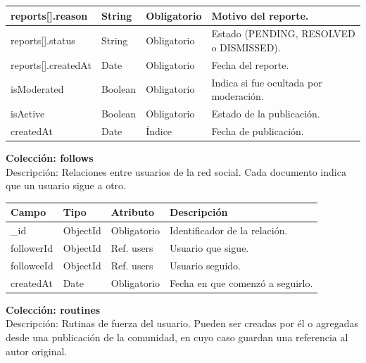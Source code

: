 {\begin{longtable}{|>{\raggedright\arraybackslash}p{4.7cm}|>{\raggedright\arraybackslash}p{1.8cm}|>{\raggedright\arraybackslash}p{2.3cm}|>{\raggedright\arraybackslash}p{5.4cm}|}
    reports[]\allowbreak .\allowbreak reason & String & Obligatorio & Motivo del reporte. \\ \hline
    reports[]\allowbreak .\allowbreak status & String & Obligatorio & Estado (PENDING, RESOLVED o DISMISSED). \\ \hline
    reports[]\allowbreak .\allowbreak createdAt & Date & Obligatorio & Fecha del reporte. \\ \hline
    isModerated & Boolean & Obligatorio & Indica si fue ocultada por moderación. \\ \hline
    isActive & Boolean & Obligatorio & Estado de la publicación. \\ \hline
    createdAt & Date & Índice & Fecha de publicación. \\ \hline
\end{longtable}
}
\noindent\textbf{Colección: follows} \\
Descripción: Relaciones entre usuarios de la red social. Cada documento indica que un usuario sigue a otro.
{\footnotesize
\renewcommand{\arraystretch}{1.2}
\begin{longtable}{|>{\raggedright\arraybackslash}p{4.7cm}|>{\raggedright\arraybackslash}p{1.8cm}|>{\raggedright\arraybackslash}p{2.3cm}|>{\raggedright\arraybackslash}p{5.4cm}|}
    \hline
    \rowcolor[HTML]{EFEFEF}
    \textbf{Campo} & \textbf{Tipo} & \textbf{Atributo} & \textbf{Descripción} \\ \hline
    \endhead
    \_id & ObjectId & Obligatorio & Identificador de la relación. \\ \hline
    followerId & ObjectId & Ref. users & Usuario que sigue. \\ \hline
    followeeId & ObjectId & Ref. users & Usuario seguido. \\ \hline
    createdAt & Date & Obligatorio & Fecha en que comenzó a seguirlo. \\ \hline
\end{longtable}
}
\newpage
\noindent\textbf{Colección: routines} \\
Descripción: Rutinas de fuerza del usuario. Pueden ser creadas por él o agregadas desde una publicación de la comunidad, en cuyo caso guardan una referencia al autor original.
